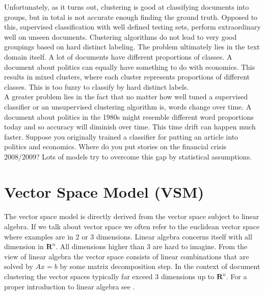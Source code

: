     Unfortunately, as it turns out, clustering is good at classifying documents into groups, but in total is not accurate enough finding the ground truth. Opposed to this, supervised classification with well defined testing sets, perform extraordinary well on unseen documents. Clustering algorithms do not lead to very good groupings based on hard distinct labeling. The problem ultimately lies in the text domain itself. A lot of documents have different proportions of classes. A document about politics can equally have something to do with economics. This results in mixed clusters, where each cluster represents proportions of different classes. This is too fuzzy to classify by hard distinct labels.\\

    A greater problem lies in the fact that no matter how well tuned a supervised classifier or an unsupervised clustering algorithm is, words change over time. A document about politics in the 1980s might resemble different word proportions today and so accuracy will diminish over time. This time drift can happen much faster. Suppose you originally trained a classifier for putting an article into politics and economics. Where do you put stories on the financial crisis 2008/2009? Lots of models try to overcome this gap by statistical assumptions.

\newpage{}
\section{Vector Space Model (VSM)}
\label{sec:vsm}

  \paragraph{}
    The vector space model is directly derived from the vector space subject to linear algebra. If we talk about vector space we often refer to the euclidean vector space where examples are in 2 or 3 dimensions. Linear algebra concerns itself with all dimension in $\mathbf{R}^{n}$. All dimensions higher than 3 are hard to imagine. From the view of linear algebra the vector space consists of linear combinations that are solved by $Ax = b$ by some matrix decomposition step. In the context of document clustering the vector spaces typically far exceed 3 dimensions up to $\mathbf{R}^{n}$. For a proper introduction to linear algebra see \cite{Strang2009}.

